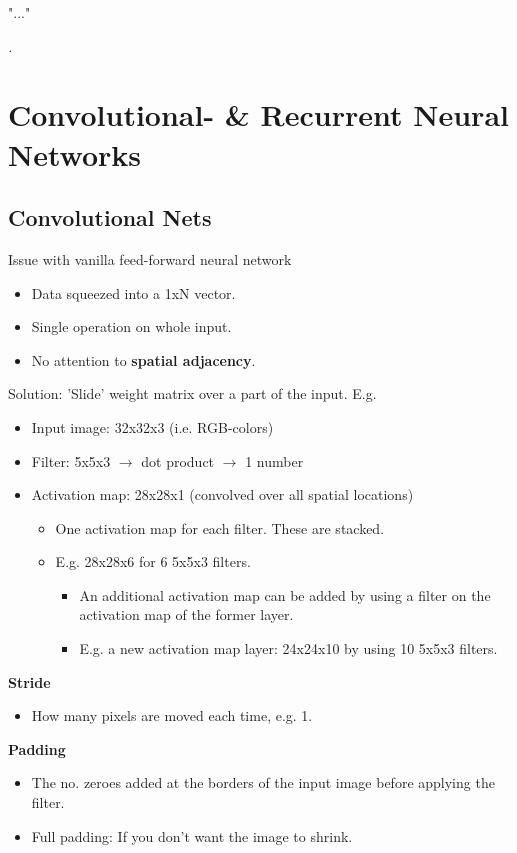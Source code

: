 \epigraph{"..."}
{\textit{.}}

\section{Convolutional- \& Recurrent Neural Networks}
\begin{multicols}{2}
\subsection{Convolutional Nets}
Issue with vanilla feed-forward neural network
\begin{itemize}
  \item Data squeezed into a 1xN vector.
  \item Single operation on whole input.
  \item No attention to \textbf{spatial adjacency}.
\end{itemize}
Solution: 'Slide' weight matrix over a part of the input. E.g.
\begin{itemize}
  \item Input image: 32x32x3 (i.e. RGB-colors)
  \item Filter: 5x5x3 $\rightarrow$ dot product $\rightarrow$ 1 number
  \item Activation map: 28x28x1 (convolved over all spatial locations)
  \begin{itemize}
    \item One activation map for each filter. These are stacked.
    \item E.g. 28x28x6 for 6 5x5x3 filters.
    \begin{itemize}
      \item An additional activation map can be added by using a filter on the activation map of the former layer.
      \item E.g. a new activation map layer: 24x24x10 by using 10 5x5x3 filters.
    \end{itemize}
  \end{itemize}
\end{itemize}
\textbf{Stride}
\begin{itemize}
  \item How many pixels are moved each time, e.g. 1.
\end{itemize}
\textbf{Padding}
\begin{itemize}
  \item The no. zeroes added at the borders of the input image before applying the filter.
  \item Full padding: If you don't want the image to shrink.

\end{itemize}
\end{multicols}
